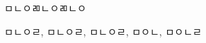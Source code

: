 \begin{summary}
    ㅁㄴㅇㄻㄴㅇㄻㄴㅇ
\end{summary}

\begin{Korkeyword}
    ㅁㄴㅇㄹ, ㅁㄴㅇㄹ, ㅁㄴㅇㄹ, ㅁㅇㄴ, ㅁㅇㄴㄹ
\end{Korkeyword}
